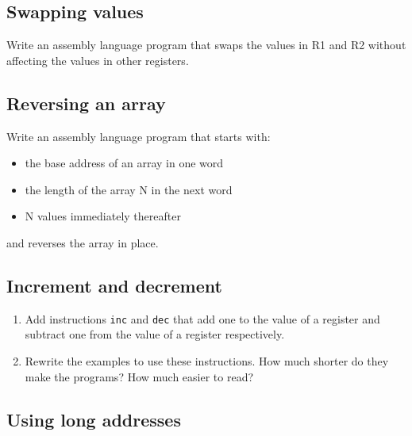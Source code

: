\documentclass{scrbook}
\begin{document}
\subsection*{Swapping values}


Write an assembly language program that swaps the values in R1 and R2
without affecting the values in other registers.

\subsection*{Reversing an array}


Write an assembly language program that starts with:

\begin{itemize}

\item the base address of an array in one word

\item the length of the array N in the next word

\item N values immediately thereafter

\end{itemize}


\noindent and reverses the array in place.

\subsection*{Increment and decrement}

\begin{enumerate}

\item 

Add instructions \texttt{inc} and \texttt{dec} that add one to the value of a register
    and subtract one from the value of a register respectively.



\item 

Rewrite the examples to use these instructions.
    How much shorter do they make the programs?
    How much easier to read?



\end{enumerate}

\subsection*{Using long addresses}
\end{document}
